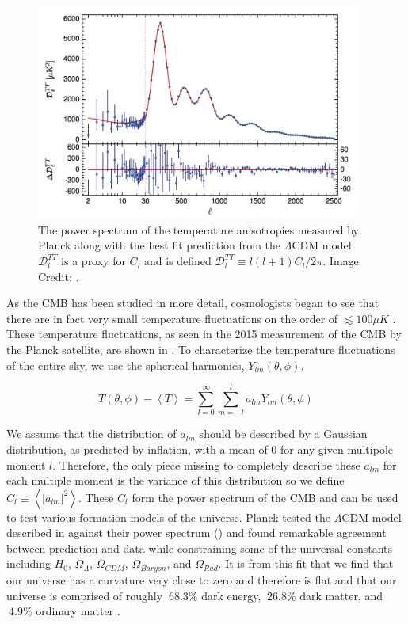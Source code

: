 \begin{figure}[ht]
	\centering
	\includegraphics[width=0.95\textwidth]{planck_2015_power_spectrum}
	\caption{The power spectrum of the temperature anisotropies measured by Planck along with the best fit prediction from the $\Lambda$CDM model.  $\mathcal{D}_l^{TT}$ is a proxy for $C_l$ and is defined $\mathcal{D}_l^{TT} \equiv l(l+1)C_l / 2 \pi$.  Image Credit: .}
	\label{fig:planck_fit}
\end{figure}


As the CMB has been studied in more detail, cosmologists began to see that there are in fact very small temperature fluctuations on the order of ${\lesssim}100 \mu K$ \cite{bennett1996four, komatsu2011seven, Ade2015}.  These temperature fluctuations, as seen in the 2015 measurement of the CMB by the Planck satellite, are shown in .  To characterize the temperature fluctuations of the entire sky, we use the spherical harmonics, $Y_{lm}(\theta, \phi)$.  


\begin{equation}
	T(\theta, \phi) -  \left< T \right> = \sum_{l=0}^{\infty} \sum_{m=-l}^{l} a_{lm} Y_{lm}(\theta, \phi)
\end{equation}

We assume that  the distribution of $a_{lm}$ should be described by a Gaussian distribution, as predicted by inflation, with a mean of 0 for any given multipole moment $l$.  Therefore, the only piece missing to completely describe these $a_{lm}$ for each multiple moment is the variance of  this distribution so we define $C_l \equiv \left<| a_{lm}|^2\right>$.  These $C_l$ form the power spectrum of the CMB and can be used to test various formation models of the universe.  Planck tested the $\Lambda$CDM model described in  against their power spectrum () and found remarkable agreement between prediction and data while constraining some of the universal constants including $H_0$, $\Omega_{\Lambda}$, $\Omega_{CDM}$, $\Omega_{Baryon}$, and $\Omega_{Rad}$.  It is from this fit that we find that our universe has a curvature very close to zero and therefore is flat and that our universe is comprised of roughly  $~68.3\%$ dark energy, $~26.8\%$ dark matter, and $~4.9\%$ ordinary matter \cite{Ade2015}.

